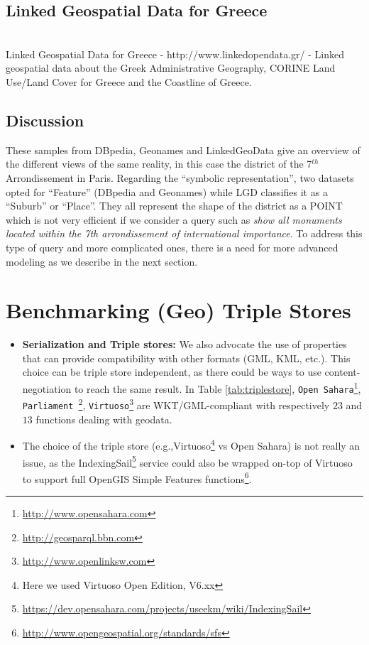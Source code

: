 \begin{itemize}
\subsection{Linked Geospatial Data for Greece}
\\

Linked Geospatial Data for Greece - http://www.linkedopendata.gr/ - Linked geospatial data about the Greek Administrative Geography, CORINE Land Use/Land Cover for Greece and the Coastline of Greece.

\subsection{Discussion}
These samples from DBpedia, Geonames and LinkedGeoData give an overview of the different views of the same reality, in this case the district of the 7$^{th}$ Arrondissement in Paris. Regarding the ``symbolic representation'', two datasets opted for ``Feature'' (DBpedia and Geonames) while LGD classifies it as a ``Suburb'' or ``Place''. They all represent the shape of the district as a POINT which is not very efficient if we consider a query such as \emph{show all monuments located within the 7th arrondissement of international importance}. To address this type of query and more complicated ones, there is a need for more advanced modeling as we describe in the next section.

\section{Benchmarking (Geo) Triple Stores}
\label{sec:benchmarking}

\begin{itemize}
\item \textbf{Serialization and Triple stores:} We also advocate the use of properties that can provide compatibility with other formats (GML, KML, etc.). This choice can be triple store independent, as there could be ways to use content-negotiation to reach the same result. In Table \ref{tab:triplestore}, \texttt{Open Sahara}\footnote{\url{http://www.opensahara.com}}, \texttt{Parliament }\footnote{\url{http://geosparql.bbn.com}},  \texttt{Virtuoso}\footnote{\url{http://www.openlinksw.com}} are WKT/GML-compliant with respectively $23$ and $13$ functions dealing with geodata.
\item The choice of the triple store (e.g.,Virtuoso\footnote{Here we used Virtuoso Open Edition, V6.xx} vs Open Sahara) is not really an issue, as the IndexingSail\footnote{\url{https://dev.opensahara.com/projects/useekm/wiki/IndexingSail}} service could also be wrapped on-top of Virtuoso to support full OpenGIS Simple Features functions\footnote{\url{http://www.opengeospatial.org/standards/sfs}}.
\end{itemize}


\end{itemize}
